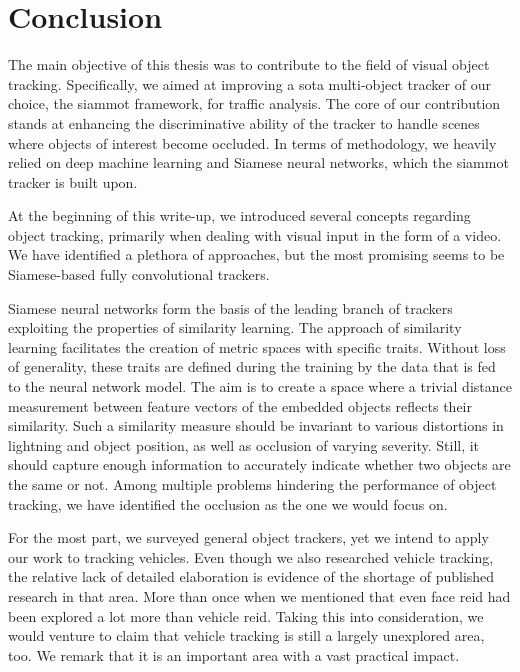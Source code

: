 \section{Conclusion}
\label{sec:Conclusion}


The main objective of this thesis was to contribute to the field of visual object tracking. Specifically, we aimed at improving a \gls{sota} multi-object tracker of our choice, the \gls{siammot} framework, for traffic analysis. The core of our contribution stands at enhancing the discriminative ability of the tracker to handle scenes where objects of interest become occluded. In terms of methodology, we heavily relied on deep machine learning and Siamese neural networks, which the \gls{siammot} tracker is built upon.

At the beginning of this write-up, we introduced several concepts regarding object tracking, primarily when dealing with visual input in the form of a video. We have identified a plethora of approaches, but the most promising seems to be Siamese-based fully convolutional trackers.

Siamese neural networks form the basis of the leading branch of trackers exploiting the properties of similarity learning. The approach of similarity learning facilitates the creation of metric spaces with specific traits. Without loss of generality, these traits are defined during the training by the data that is fed to the neural network model. The aim is to create a space where a trivial distance measurement between feature vectors of the embedded objects reflects their similarity. Such a similarity measure should be invariant to various distortions in lightning and object position, as well as occlusion of varying severity. Still, it should capture enough information to accurately indicate whether two objects are the same or not. Among multiple problems hindering the performance of object tracking, we have identified the occlusion as the one we would focus on.

For the most part, we surveyed general object trackers, yet we intend to apply our work to tracking vehicles. Even though we also researched vehicle tracking, the relative lack of detailed elaboration is evidence of the shortage of published research in that area. More than once when we mentioned that even face \gls{reid} had been explored a lot more than vehicle \gls{reid}. Taking this into consideration, we would venture to claim that vehicle tracking is still a largely unexplored area, too. We remark that it is an important area with a vast practical impact.

